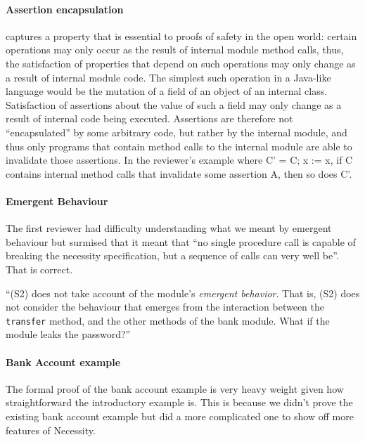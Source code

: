 \documentclass[11pt]{amsart}
\begin{document}
\paragraph{Assertion encapsulation} captures a property that is essential to proofs of safety in the open world: certain operations may only occur as the result of internal module method calls, thus, the satisfaction of properties that depend on such operations may only change as a result of internal module code. The simplest such operation in a Java-like language would be the mutation of a field of an object of an internal class. Satisfaction of assertions about the value of such a field may only change as a result of internal code being executed. Assertions are therefore not ``encapsulated'' by some arbitrary code, but rather by the internal module, and thus only programs that contain method calls to the internal module are able to invalidate those assertions. In the reviewer's example where C' = C; x := x, if C contains internal method calls that invalidate some assertion A, then so does C'.

\paragraph{Emergent Behaviour} 
The first reviewer had difficulty understanding what we meant by emergent behaviour but surmised that it meant that  ``no single procedure call is capable of breaking the necessity specification, but a sequence of calls can very well be''. That is correct.

``(S2) does not take account of the module's \emph{emergent behavior}. That is, (S2) does not consider the behaviour that emerges from the interaction between the 
\texttt{transfer} method, and the other methods of the bank module. What if the module leaks the password?''

\paragraph{Bank Account example} The formal proof of the bank account example is very heavy weight given how straightforward the introductory example is. This is because we didn't prove the existing bank account example but did a more complicated one to show off more features of Necessity.
\end{document}
